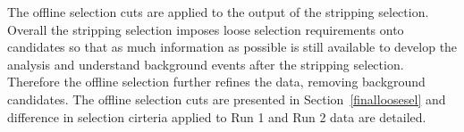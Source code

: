 


The offline selection cuts are applied to the output of the stripping selection. Overall the stripping selection imposes loose selection requirements onto \bmumu candidates so that as much information as possible is still available to develop the analysis and understand background events after the stripping selection. Therefore the offline selection further refines the data, removing background candidates. The offline selection cuts are presented in Section~\ref{finalloosesel} and difference in selection cirteria applied to Run 1 and Run 2 data are detailed. 


 



